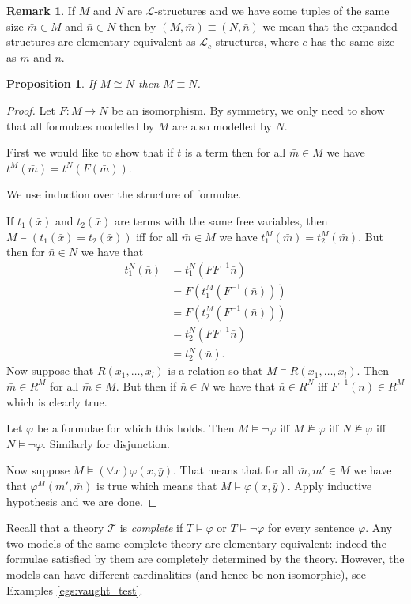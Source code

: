 \documentclass{report}
\theoremstyle{definition}
\theoremstyle{plain}
\newtheorem{prop}[thm]{Proposition}
\theoremstyle{definition}
\newtheorem*{rem*}{Remark}
\begin{document}
	\begin{rem*}
		If $M$ and $N$ are $\mathcal{L}$-structures and we have some tuples of the same size $\bar{m}\in M$ and $\bar{n}\in N$ then by $(M,\bar{m}) \equiv (N,\bar{n})$ we mean that the expanded structures are elementary equivalent as $\mathcal{L}_{\bar{c}}$-structures, where $\bar{c}$ has the same size as $\bar{m}$ and $\bar{n}$.
	\end{rem*}
	\begin{prop}\label{prop:iso_imp_el_equiv}
		If $M\cong N$ then $M \equiv N$.
	\end{prop}
	\begin{proof}
		Let $F\colon M \to N$ be an isomorphism. By symmetry, we only need to show that all formulaes modelled by $M$ are also modelled by $N$.
		
		
		First we would like to show that if $t$ is a term then for all $\bar{m} \in M$ we have $t^M(\bar{m}) = t^N(F(\bar{m}))$.
		
		We use induction over the structure of formulae.
		
		If $t_1(\bar{x})$ and $t_2(\bar{x})$ are terms with the same free variables, then $M \models (t_1(\bar{x}) = t_2(\bar{x}))$ iff for all $\bar{m}\in M$ we have $t_1^M(\bar{m}) = t_2^M(\bar{m})$. But then for $\bar{n}\in N$ we have that
		\begin{align*}
			t_1^N(\bar{n}) &= t_1^N(FF^{-1}\bar{n})\\
			&= F(t_1^M(F^{-1}(\bar{n})))\\
			&= F(t_2^M(F^{-1}(\bar{n})))\\
			&= t_2^N(FF^{-1}\bar{n})\\
			&= t_2^N(\bar{n}).
		\end{align*}
		Now suppose that $R(x_1,\ldots,x_l)$ is a relation so that $M \models R(x_1,\ldots,x_l)$. Then $\bar{m}\in R^M$ for all $\bar{m}\in M$. But then if $\bar{n}\in N$ we have that $\bar{n}\in R^N$ iff $F^{-1}(n)\in R^M$ which is clearly true.
		
		Let $\varphi$ be a formulae for which this holds. Then $M\models \neg\varphi$ iff $M \nvDash \varphi$ iff $N \nvDash \varphi$ iff $N \models \neg\varphi$. Similarly for disjunction.
		
		Now suppose $M \models (\forall x) \varphi(x,\bar{y})$. That means that for all $\bar{m},m'\in M$ we have that  $\varphi^M(m',\bar{m})$ is true which means that $M\models \varphi(x,\bar{y})$. Apply inductive hypothesis and we are done.
		\end{proof}
		Recall that a theory $\mathcal{T}$ is \emph{complete} if $T\models \varphi$ or $T \models \neg \varphi$ for every sentence $\varphi$. Any two models of the same complete theory are elementary equivalent: indeed the formulae satisfied by them are completely determined by the theory. However, the models can have different cardinalities (and hence be non-isomorphic), see Examples \ref{egs:vaught_test}.
		
\end{document}
